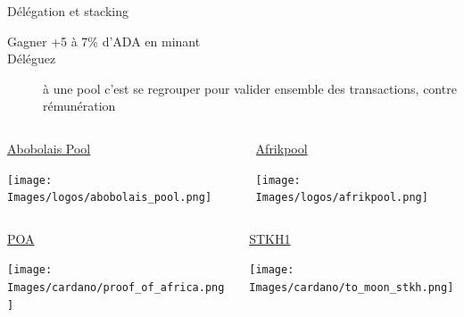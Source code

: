 \documentclass{beamer}
\begin{document}
\begin{frame}[label={sec:org085f67a}]{Délégation et stacking}
  \begin{description}
  \item[{Gagner +5 à 7\% d'ADA en minant}] 

  \item[{Déléguez}] à \alert{une pool} c'est se regrouper pour valider ensemble des transactions, contre rémunération
  \end{description}
  \begin{block}{}
    \begin{columns}
      \begin{column}{0.48\columnwidth}
        \begin{block}{\href{https://www.abobolaispool.com/}{Abobolais Pool}}
          \begin{center}
            \texttt{[image: Images/logos/abobolais\_pool.png]}
          \end{center}
        \end{block}
      \end{column}

      \begin{column}{0.48\columnwidth}
        \begin{block}{\href{https://cardano.afrikpool.org/}{Afrikpool}}
          \begin{center}
            \texttt{[image: Images/logos/afrikpool.png]}
          \end{center}
        \end{block}
      \end{column}
    \end{columns}
  \end{block}
  \begin{block}{}
    \begin{columns}
      \begin{column}{0.48\columnwidth}
        \begin{block}{\href{https://adapools.org/pool/683e89fa1bcde139504b11fbfd914f8ebe9b8db2678b3da0abdcb2f1}{POA}}
          \begin{center}
            \texttt{[image: Images/cardano/proof\_of\_africa.png]}
          \end{center}
        \end{block}
      \end{column}

      \begin{column}{0.48\columnwidth}
        \begin{block}{\href{https://adapools.org/pool/b62ecc8ce7e46c4443b63b91fffaeb19f869d191a7d2381087aaa768}{STKH1}}
          \begin{center}
            \texttt{[image: Images/cardano/to\_moon\_stkh.png]}
          \end{center}
        \end{block}
      \end{column}
    \end{columns}
  \end{block}
\end{frame}
\end{document}
